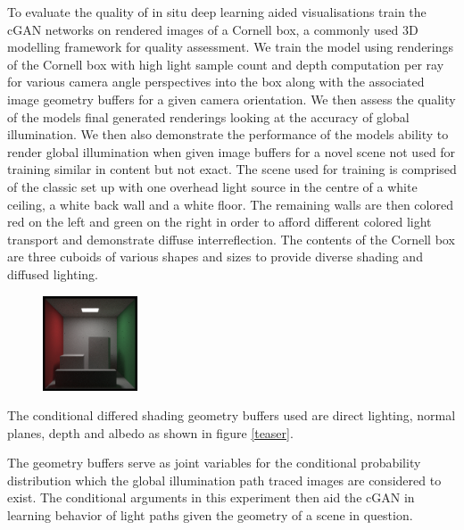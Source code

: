 \documentclass[sigconf]{acmart}%
\begin{document}
To evaluate the quality of in situ deep learning aided visualisations train the cGAN networks on rendered images of a Cornell box, a commonly used 3D modelling framework for quality assessment. We train the model using renderings of the Cornell box with high light sample count and depth computation per ray for various camera angle perspectives into the box along with the associated image geometry buffers for a given camera orientation. We then assess the quality of the models final generated renderings looking at the accuracy of global illumination. We then also demonstrate the performance of the models ability to render global illumination when given image buffers for a novel scene not used for training similar in content but not exact. The scene used for training is comprised of the classic set up with one overhead light source in the centre of a white ceiling, a white back wall and a white floor. The remaining walls are then colored red on the left and green on the right in order to afford different colored light transport and demonstrate diffuse interreflection. The contents of the Cornell box are three cuboids of various shapes and sizes to provide diverse shading and diffused lighting. 

\begin{figure}[h]
\includegraphics[width=0.25\textwidth]{sc-1080-d-45.png}
\end{figure}

The conditional differed shading geometry buffers used are direct lighting, normal planes, depth and albedo as shown in figure \ref{teaser}.

The geometry buffers serve as joint variables for the conditional probability distribution which the global illumination path traced images are considered to exist. The conditional arguments in this experiment then aid the cGAN in learning behavior of light paths given the geometry of a scene in question. 
\end{document}
